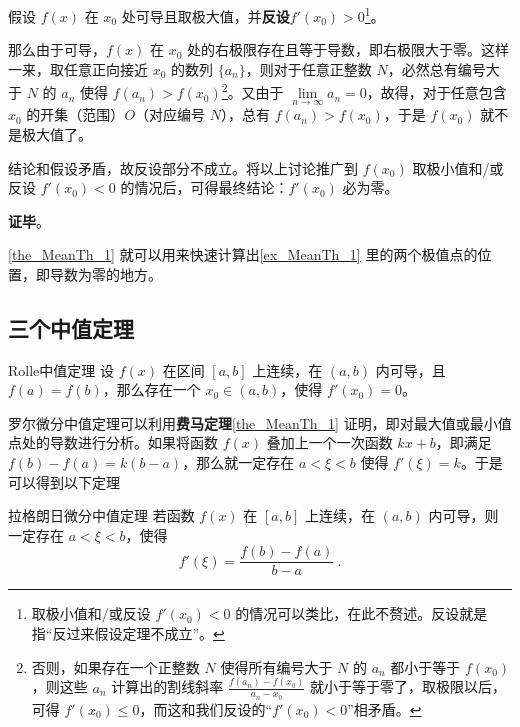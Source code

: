 假设 $f(x)$ 在 $x_0$ 处可导且取极大值，并\textbf{反设}$f'(x_0)>0$\footnote{取极小值和/或反设 $f'(x_0)<0$ 的情况可以类比，在此不赘述。反设就是指“反过来假设定理不成立”。}。

那么由于可导，$f(x)$ 在 $x_0$ 处的右极限存在且等于导数，即右极限大于零。这样一来，取任意正向接近 $x_0$ 的数列 $\{a_n\}$，则对于任意正整数 $N$，必然总有编号大于 $N$ 的 $a_n$ 使得 $f(a_n)>f(x_0)$\footnote{否则，如果存在一个正整数 $N$ 使得所有编号大于 $N$ 的 $a_n$ 都小于等于 $f(x_0)$，则这些 $a_n$ 计算出的割线斜率 $\frac{f(a_n)-f(x_0)}{a_n-x_0}$ 就小于等于零了，取极限以后，可得 $f'(x_0)\leq 0$，而这和我们反设的“$f'(x_0)<0$”相矛盾。}。又由于 $\lim\limits_{n\to\infty}a_n=0$，故得，对于任意包含 $x_0$ 的开集（范围）$O$（对应编号 $N$），总有 $f(a_n)>f(x_0)$，于是 $f(x_0)$ 就不是极大值了。

结论和假设矛盾，故反设部分不成立。将以上讨论推广到 $f(x_0)$ 取极小值和/或反设 $f'(x_0)<0$ 的情况后，可得最终结论：$f'(x_0)$ 必为零。

\textbf{证毕}。

\autoref{the_MeanTh_1} 就可以用来快速计算出\autoref{ex_MeanTh_1} 里的两个极值点的位置，即导数为零的地方。


\subsection{三个中值定理}


\begin{definition}{Rolle中值定理}
设 $f(x)$ 在区间 $[a, b]$ 上连续，在 $(a, b)$ 内可导，且 $f(a)=f(b)$，那么存在一个 $x_0\in(a, b)$，使得 $f'(x_0)=0$。
\end{definition}

罗尔微分中值定理可以利用\textbf{费马定理}\autoref{the_MeanTh_1} 证明，即对最大值或最小值点处的导数进行分析。如果将函数 $f(x)$ 叠加上一个一次函数 $kx+b$，即满足 $f(b)-f(a)=k(b-a)$，那么就一定存在 $a< \xi <b$ 使得 $f'(\xi)=k$。于是可以得到以下定理

\begin{theorem}{拉格朗日微分中值定理}\label{the_MeanTh_2}
若函数 $f(x)$ 在 $[a,b]$ 上连续，在 $(a,b)$ 内可导，则一定存在 $a< \xi <b$，使得
\begin{equation}\label{eq_MeanTh_2}
f'(\xi)=\frac{f(b)-f(a)}{b-a}~.
\end{equation}
\end{theorem}

